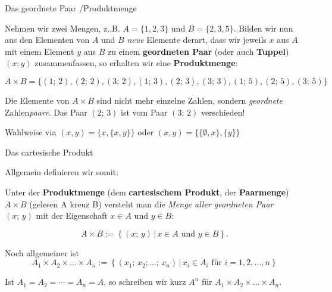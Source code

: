 \documentclass[12pt,ngerman,a4paper,ignorenonframetext,]{beamer}
\begin{document}
\begin{frame}{Das geordnete Paar /\thinspace{}Produktmenge}
\protect\hypertarget{das-geordnete-paar-produktmenge}{}

Nehmen wir zwei Mengen, z.,B. \(A=\{1,2,3\}\) und \(B=\{2,3,5\}\).
Bilden wir nun aus den Elementen von \(A\) und \(B\) \emph{neue}
Elemente derart, dass wir jeweils \(x\) aus \(A\) mit einem Element
\(y\) aus \(B\) zu einem \textbf{geordneten Paar} (oder auch
\textbf{Tuppel}) \((x; y)\) zusammenfassen, so erhalten wir eine
\textbf{Produktmenge}:

\[ A \times B   = \{ (1;\, 2), (2;\, 2), (3;\, 2), (1;\, 3), (2;\, 3), (3;\, 3), (1;\, 5), (2;\, 5), (3;\, 5) \} \]

Die Elemente von \(A \times B\) sind nicht mehr einzelne Zahlen, sondern
\emph{geordnete} Zahlen\emph{paare}. Das Paar \((2;\, 3)\) ist vom Paar
\((3;\, 2)\) verschieden!


\begin{definition}

Wahlweise via \((x, y) = \{ x, \{x, y\}\}\) oder
\((x, y) = \{ \{\emptyset, x\}, \{y\}\}\)

\end{definition}

\end{frame}

\begin{frame}{Das cartesische Produkt}
\protect\hypertarget{das-cartesische-produkt}{}

Allgemein definieren wir somit:


\begin{definition}[Produktmenge]

Unter der \textbf{Produktmenge} (dem \textbf{cartesischem Produkt}, der
\textbf{Paarmenge}) \(A \times B\) (gelesen \glqq A kreuz B\grqq)
versteht man die \emph{Menge aller geordneten Paar} \((x;\, y)\) mit der
Eigenschaft \(x \in A\) und \(y \in B\):

\[  A \times B := \left\{ (x; \, y) \,|\, x \in A \text{ und } y \in B \right\}. \]

Noch allgemeiner ist
\[ A_1 \times A_2 \times \dots \times A_n := \left\{ (x_1;\, x_2; \dots;\, x_n) \,|\, x_i \in A_i \text{ für } i=1,2, \dots, n \right\} \]

\end{definition}


\begin{Bemerkung}[]

Ist \(A_1=A_2=\cdots=A_n=A\), so schreiben wir kurz \(A^n\) für
\(A_1 \times A_2 \times \dots \times A_n\).

\end{Bemerkung}

\end{frame}
\end{document}
